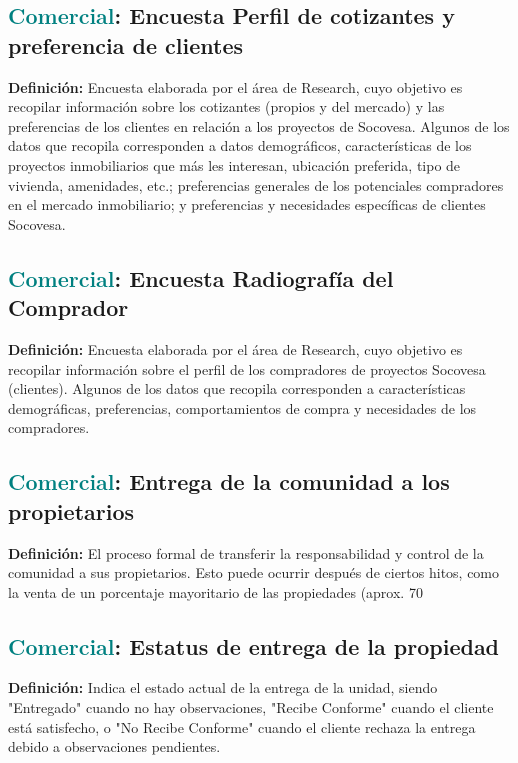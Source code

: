 \documentclass[12pt]{article}
\begin{document}
\subsection{\textcolor{teal}{Comercial}: Encuesta Perfil de cotizantes y preferencia de clientes}
\textbf{Definición:} Encuesta elaborada por el área de Research, cuyo objetivo es recopilar información sobre los cotizantes (propios y del mercado) y las preferencias de los clientes en relación a los proyectos de Socovesa. Algunos de los datos que recopila corresponden a datos demográficos, características de los proyectos inmobiliarios que más les interesan, ubicación preferida, tipo de vivienda, amenidades, etc.; preferencias generales de los potenciales compradores en el mercado inmobiliario; y preferencias y necesidades específicas de clientes Socovesa.
\subsection{\textcolor{teal}{Comercial}: Encuesta Radiografía del Comprador}
\textbf{Definición:} Encuesta elaborada por el área de Research, cuyo objetivo es recopilar información sobre el perfil de los compradores de proyectos Socovesa (clientes). Algunos de los datos que recopila corresponden a características demográficas, preferencias, comportamientos de compra y necesidades de los compradores.
\subsection{\textcolor{teal}{Comercial}: Entrega de la comunidad a los propietarios}
\textbf{Definición:} El proceso formal de transferir la responsabilidad y control de la comunidad a sus propietarios. Esto puede ocurrir después de ciertos hitos, como la venta de un porcentaje mayoritario de las propiedades (aprox. 70%
\subsection{\textcolor{teal}{Comercial}: Estatus de entrega de la propiedad}
\textbf{Definición:} Indica el estado actual de la entrega de la unidad, siendo "Entregado" cuando no hay observaciones, "Recibe Conforme" cuando el cliente está satisfecho, o "No Recibe Conforme" cuando el cliente rechaza la entrega debido a observaciones pendientes.
\end{document}
